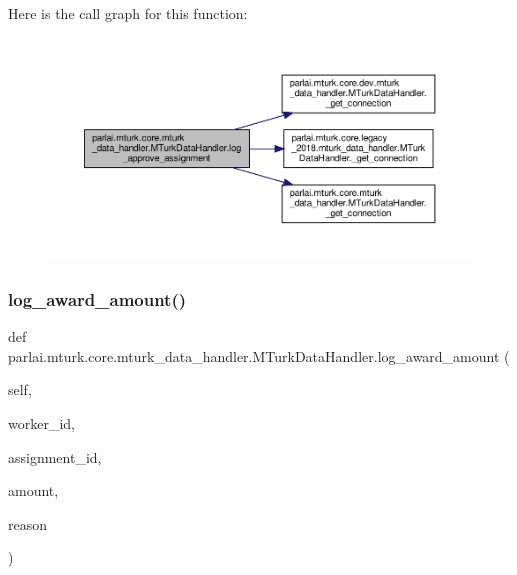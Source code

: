 Here is the call graph for this function\+:
\nopagebreak
\begin{figure}[H]
\begin{center}
\leavevmode
\includegraphics[width=350pt]{classparlai_1_1mturk_1_1core_1_1mturk__data__handler_1_1MTurkDataHandler_adfbc9d075e9c0ffe22fc203676ad0a77_cgraph}
\end{center}
\end{figure}
\mbox{\label{classparlai_1_1mturk_1_1core_1_1mturk__data__handler_1_1MTurkDataHandler_a399c5d70b0e2509b061f0d0f627a3f01}} 
\subsubsection{\texorpdfstring{log\+\_\+award\+\_\+amount()}{log\_award\_amount()}}
{\footnotesize\ttfamily def parlai.\+mturk.\+core.\+mturk\+\_\+data\+\_\+handler.\+M\+Turk\+Data\+Handler.\+log\+\_\+award\+\_\+amount (\begin{DoxyParamCaption}\item[{}]{self,  }\item[{}]{worker\+\_\+id,  }\item[{}]{assignment\+\_\+id,  }\item[{}]{amount,  }\item[{}]{reason }\end{DoxyParamCaption})}

